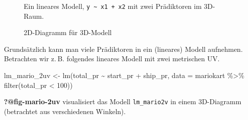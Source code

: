 \documentclass[
  letterpaper,
]{scrbook}
\newenvironment{Shaded}{\begin{snugshade}}{\end{snugshade}}
\newcommand{\AttributeTok}[1]{\textcolor[rgb]{0.40,0.45,0.13}{#1}}
\newcommand{\DecValTok}[1]{\textcolor[rgb]{0.68,0.00,0.00}{#1}}
\newcommand{\FunctionTok}[1]{\textcolor[rgb]{0.28,0.35,0.67}{#1}}
\newcommand{\NormalTok}[1]{\textcolor[rgb]{0.00,0.23,0.31}{#1}}
\newcommand{\OtherTok}[1]{\textcolor[rgb]{0.00,0.23,0.31}{#1}}
\newcommand{\SpecialCharTok}[1]{\textcolor[rgb]{0.37,0.37,0.37}{#1}}
\theoremstyle{definition}
\theoremstyle{definition}
\theoremstyle{definition}
\theoremstyle{remark}
\begin{document}
\begin{figure}
\begin{minipage}{0.33\linewidth}
\end{minipage}%

\caption{\label{fig-3d-regr-statisch}Ein lineares Modell,
\texttt{y\ \textasciitilde{}\ x1\ +\ x2} mit zwei Prädiktoren im
3D-Raum.}

\end{figure}%

\begin{figure}


\caption{\label{fig-3d-regr-2d}2D-Diagramm für 3D-Modell}

\end{figure}%

Grundsätzlich kann man viele Prädiktoren in ein (lineares) Modell
aufnehmen. Betrachten wir z. B. folgendes lineares Modell mit zwei
metrischen UV.

\begin{Shaded}
\begin{Highlighting}[]
\NormalTok{lm\_mario\_2uv }\OtherTok{\textless{}{-}} \FunctionTok{lm}\NormalTok{(total\_pr }\SpecialCharTok{\textasciitilde{}}\NormalTok{ start\_pr }\SpecialCharTok{+}\NormalTok{ ship\_pr, }\AttributeTok{data =}\NormalTok{ mariokart }\SpecialCharTok{\%\textgreater{}\%} \FunctionTok{filter}\NormalTok{(total\_pr }\SpecialCharTok{\textless{}} \DecValTok{100}\NormalTok{))}
\end{Highlighting}
\end{Shaded}

\textbf{?@fig-mario-2uv} visualisiert das Modell \texttt{lm\_mario2v} in
einem 3D-Diagramm (betrachtet aus verschiedenen Winkeln).
\end{document}
